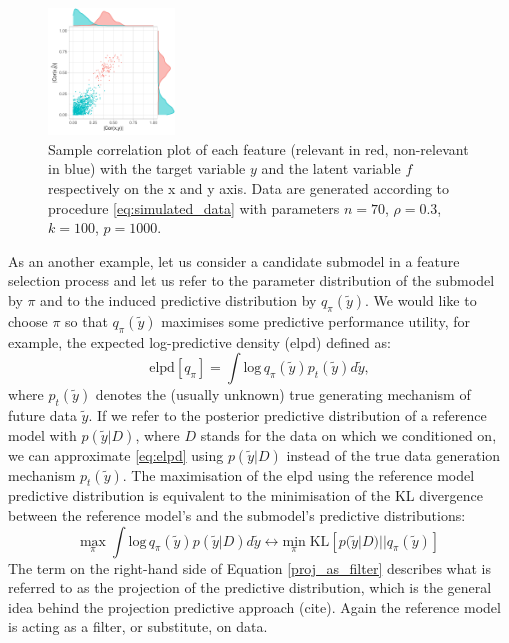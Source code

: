 \documentclass[american,]{article}
\theoremstyle{definition}
\begin{document}
\begin{figure}[tp]
  \centering
  \includegraphics[width=0.3\textwidth]{graphics/correlation.pdf}
  \caption{Sample correlation plot of each feature (relevant in red, non-relevant in blue) with the target variable $y$ and the latent variable $f$ respectively on the x and y axis. Data are generated according to procedure \eqref{eq:simulated_data} with parameters $n=70$, $\rho=0.3$, $k=100$, $p=1000$.\\}
  \label{fig:correlation}
\end{figure}

As an another example, let us consider a candidate submodel in a feature selection process and let us refer to the parameter distribution of the submodel by $\pi$ and to the induced predictive distribution by $q_{\pi}(\tilde{y})$. We would like to choose $\pi$ so that $q_{\pi}(\tilde{y})$ maximises some predictive performance utility, for example, the expected log-predictive density (elpd) defined as:
\
\begin{equation}\label{eq:elpd}
\text{elpd}[q_{\pi}]=\int \text{log}\,q_{\pi}(\tilde{y})p_{t}(\tilde{y})d\tilde{y},
\end{equation}
where $p_{t}(\tilde{y})$ denotes the (usually unknown) true generating mechanism of future data $\tilde{y}$. If we refer to the posterior predictive distribution of a reference model with $p(\tilde{y}|D)$, where $D$ stands for the data on which we conditioned on, we can approximate \eqref{eq:elpd} using $p(\tilde{y}|D)$ instead of the true data generation mechanism $p_{t}(\tilde{y})$. The maximisation of the elpd using the reference model predictive distribution is equivalent to the minimisation of the KL divergence between the reference model's and the submodel's predictive distributions:
\
\begin{equation} \label{proj_as_filter}
\underset{\pi}{\text{max}} \; \int \text{log}\,q_{\pi}(\tilde{y})p(\tilde{y}|D)d\tilde{y} \leftrightarrow \underset{\pi}{\text{min}} \; \text{KL}[p(\tilde{y}|D)||q_{\pi}(\tilde{y})] 
\end{equation}
The term on the right-hand side of Equation \eqref{proj_as_filter} describes what is referred to as the projection of the predictive distribution, which is the general idea behind the projection predictive approach (cite). Again the reference model is acting as a filter, or substitute, on data.
\end{document}
